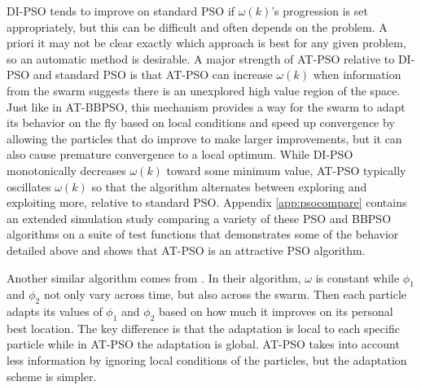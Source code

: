 \documentclass[cmbright]{staauth}
\begin{document}
DI-PSO tends to improve on standard PSO if $\omega(k)$'s progression is set appropriately, but this can be difficult and often depends on the problem. A priori it may not be clear exactly which approach is best for any given problem, so an automatic method is desirable. A major strength of AT-PSO relative to DI-PSO and standard PSO is that AT-PSO can increase $\omega(k)$ when information from the swarm suggests there is an unexplored high value region of the space. Just like in AT-BBPSO, this mechanism provides a way for the swarm to adapt its behavior on the fly based on local conditions and speed up convergence by allowing the particles that do improve to make larger improvements, but it can also cause premature convergence to a local optimum. While DI-PSO monotonically decreases $\omega(k)$ toward some minimum value, AT-PSO typically oscillates $\omega(k)$ so that the algorithm alternates between exploring and exploiting more, relative to standard PSO. Appendix \ref{app:psocompare} contains an extended simulation study comparing a variety of these PSO and BBPSO algorithms on a suite of test functions that demonstrates some of the behavior detailed above and shows that AT-PSO is an attractive PSO algorithm.

Another similar algorithm comes from \citet{zhang2003adaptive}. In their algorithm, $\omega$ is constant while $\phi_1$ and $\phi_2$ not only vary across time, but also across the swarm. Then each particle adapts its values of $\phi_1$ and $\phi_2$ based on how much it improves on its personal best location. The key difference is that the adaptation is local to each specific particle while in AT-PSO the adaptation is global. AT-PSO takes into account less information by ignoring local conditions of the particles, but the adaptation scheme is simpler.
\end{document}
